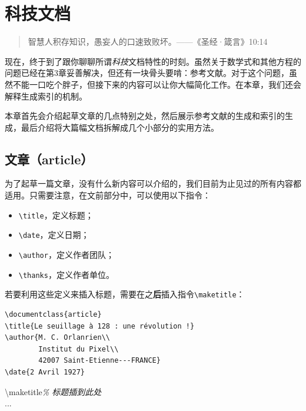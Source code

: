 \chapter{科技文档}

\begin{quote}
    智慧人积存知识，愚妄人的口速致败坏。——《圣经·箴言》10:14
\end{quote}

现在，终于到了跟你聊聊所谓\emph{科技}文档特性的时刻。虽然关于数学式和其他方程的问题已经在第3章妥善解决，但还有一块骨头要啃：参考文献。对于这个问题，虽然不能一口吃个胖子，但接下来的内容可以让你大幅简化工作。在本章，我们还会解释生成索引的机制。

本章首先会介绍起草文章的几点特别之处，然后展示参考文献的生成和索引的生成，最后介绍将大篇幅文档拆解成几个小部分的实用方法。

\section{文章（article）}

为了起草一篇文章，没有什么新内容可以介绍的，我们目前为止见过的所有内容都适用。只需要注意，在文前部分中，可以使用以下指令：

\begin{itemize}
    \item \verb|\title|，定义标题；
    \item \verb|\date|，定义日期；
    \item \verb|\author|，定义作者团队；
    \item \verb|\thanks|，定义作者单位。
\end{itemize}

若要利用这些定义来插入标题，需要在\verb||之\textbf{后}插入指令\verb|\maketitle|：

\begin{dmd}
\begin{verbatim}
\documentclass{article}
\title{Le seuillage à 128 : une révolution !}
\author{M. C. Orlanrien\\
        Institut du Pixel\\
        42007 Saint-Etienne---FRANCE}
\date{2 Avril 1927}

\end{verbatim}
\backslash maketitle\textsl{\% 标题插到此处}\\
...\\
\verb||
\end{dmd}

